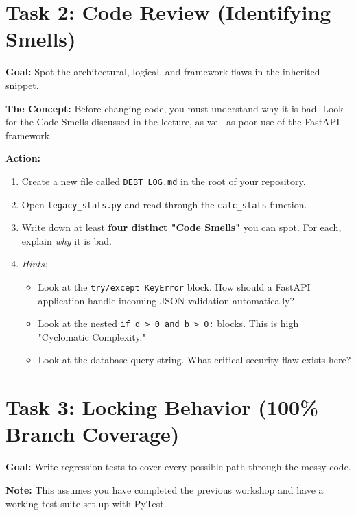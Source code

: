 \documentclass[a4paper,12pt]{article}
\begin{document}
\section*{Task 2: Code Review (Identifying Smells)}

\textbf{Goal:} Spot the architectural, logical, and framework flaws in the inherited snippet.

\textbf{The Concept:} Before changing code, you must understand why it is bad. Look for the Code Smells discussed in the lecture, as well as poor use of the FastAPI framework.

\vspace{0.3cm}
\textbf{Action:}
\begin{enumerate}
    \item Create a new file called \texttt{DEBT\_LOG.md} in the root of your repository.
    \item Open \texttt{legacy\_stats.py} and read through the \texttt{calc\_stats} function.
    \item Write down at least \textbf{four distinct "Code Smells"} you can spot. For each, explain \textit{why} it is bad.
    \item \textit{Hints:} 
    \begin{itemize}
        \item Look at the \texttt{try/except KeyError} block. How should a FastAPI application handle incoming JSON validation automatically?
        \item Look at the nested \texttt{if d > 0 and b > 0:} blocks. This is high "Cyclomatic Complexity."
        \item Look at the database query string. What critical security flaw exists here?
    \end{itemize}
\end{enumerate}


\section*{Task 3: Locking Behavior (100\% Branch Coverage)}

\textbf{Goal:} Write regression tests to cover every possible path through the messy code.

\textbf{Note:} This assumes you have completed the previous workshop and have a working test suite set up with PyTest.
\end{document}
